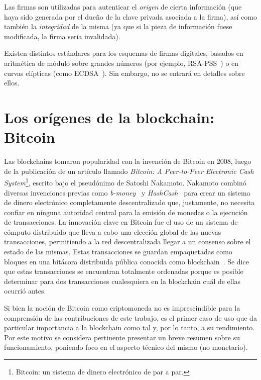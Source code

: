 Las firmas son utilizadas para autenticar el \textit{origen} de cierta información (que haya sido generada por el dueño de la clave privada
asociada a la firma), así como también la \textit{integridad} de la misma (ya que si la pieza de información fuese modificada, la firma sería invalidada).

%

Existen distintos estándares para los esquemas de firmas digitales, basados en aritmética de módulo sobre grandes números (por ejemplo,
RSA-PSS~\cite{pss.rsa}) o en curvas elípticas (como ECDSA~\cite{ecdsa}).
Sin embargo, no se entrará en detalles sobre ellos.

\section{Los orígenes de la blockchain: Bitcoin}
Las blockchains tomaron popularidad con la invención de Bitcoin en 2008, luego de la publicación
de un artículo llamado \textit{Bitcoin: A Peer-to-Peer
Electronic Cash System}\footnote{Bitcoin: un sistema de dinero electrónico de par a par.}, escrito
bajo el pseudónimo de Satoshi Nakamoto.
Nakamoto combinó diversas invenciones previas como
\textit{b-money}~\cite{b.money} y \textit{HashCash}~\cite{hashcash} para crear un sistema de dinero electrónico completamente
descentralizado que, justamente, no necesita confiar en ninguna autoridad central para la emisión de monedas
o la ejecución de transacciones. 
La innovación clave en Bitcoin fue el uso de un sistema de cómputo distribuido que lleva
a cabo una elección global de las nuevas transacciones, permitiendo
a la red descentralizada llegar a un consenso sobre el estado de las mismas. Estas transacciones
se guardan empaquetadas como bloques en una bitácora distribuida pública conocida como blockchain~\cite{mastering.bitcoin}.
%
Se dice que estas transacciones se encuentran totalmente ordenadas porque es posible determinar para
dos transacciones cualesquiera en la blockchain cuál de ellas ocurrió antes.


%
Si bien la noción de Bitcoin como criptomoneda no es imprescindible para la comprensión de las
contribuciones de este trabajo, es el primer caso de uso que da particular importancia a la blockchain
como tal y, por lo tanto, a su rendimiento. Por este motivo se considera pertinente presentar un breve resumen sobre
su funcionamiento, poniendo foco en el aspecto técnico del mismo (no monetario).

